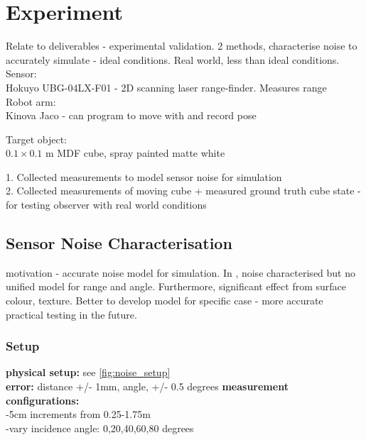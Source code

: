 \chapter{Experiment}
Relate to deliverables - experimental validation.
2 methods, characterise noise to accurately simulate - ideal conditions.
Real world, less than ideal conditions.
Sensor:\\
Hokuyo UBG-04LX-F01 - 2D scanning laser range-finder. Measures range\\

Robot arm: \\
Kinova Jaco - can program to move with and record pose

Target object: \\
$0.1 \times 0.1$ m MDF cube, spray painted matte white

1. Collected measurements to model sensor noise for simulation\\
2. Collected measurements of moving cube + measured ground truth cube state - for testing observer with real world conditions

\section{Sensor Noise Characterisation} \label{sensor_noise}
motivation - accurate noise model for simulation. In \cite{park2010characterization}, noise characterised but no unified model for range and angle. Furthermore, significant effect from surface colour, texture. Better to develop model for specific case - more accurate practical testing in the future.

	\subsection{Setup}
		\textbf{physical setup:} see \ref{fig:noise_setup}\\
		\textbf{error:} distance +/- 1mm, angle, +/- 0.5 degrees
		\textbf{measurement configurations:}\\
			-5cm increments from 0.25-1.75m\\
			-vary incidence angle: 0,20,40,60,80 degrees
		 
